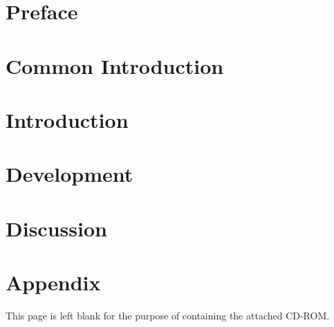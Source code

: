 \thispagestyle{empty}

\cleardoublepage


\chapter*{Preface}


\cleardoublepage
\tableofcontents*


\chapter{Common Introduction}
\label{chap:common_introduction}
%


\chapter{Introduction}

% 
% 




\chapter{Development}









\chapter{Discussion}







\clearpage{\thispagestyle{empty}\cleardoublepage}

\chapter{Appendix}




\label{bib}

\cleardoublepage
\thispagestyle{empty}
\vspace*{4cm}
\label{cd}
{\centering This page is left blank for the purpose of containing the attached CD-ROM.}

\listoffixmes

